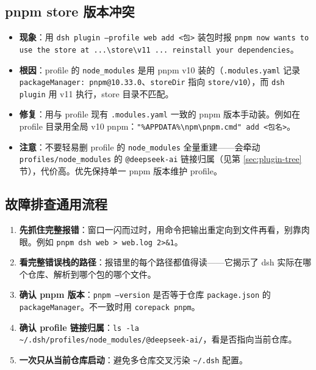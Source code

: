 \documentclass[11pt]{ctexart}
\newcommand{\code}[1]{\texttt{\small #1}}
\begin{document}
\subsection{pnpm store 版本冲突}

\begin{itemize}[itemsep=2pt]
  \item \textbf{现象}：用 \code{dsh plugin --profile web add <包>} 装包时报 \code{pnpm now wants to use the store at ...\textbackslash store\textbackslash v11 ... reinstall your dependencies}。
  \item \textbf{根因}：profile 的 \code{node\_modules} 是用 pnpm v10 装的（\code{.modules.yaml} 记录 \code{packageManager: pnpm@10.33.0}、\code{storeDir} 指向 \code{store/v10}），而 \code{dsh plugin} 用 v11 执行，store 目录不匹配。
  \item \textbf{修复}：用与 profile 现有 \code{.modules.yaml} 一致的 pnpm 版本手动装。例如在 profile 目录用全局 v10 pnpm：\code{"\%APPDATA\%\textbackslash npm\textbackslash pnpm.cmd" add <包名>}。
  \item \textbf{注意}：不要轻易删 profile 的 \code{node\_modules} 全量重建——会牵动 \code{profiles/node\_modules} 的 \code{@deepseek-ai} 链接归属（见第 \ref{sec:plugin-tree} 节），代价高。优先保持单一 pnpm 版本维护 profile。
\end{itemize}

\subsection{故障排查通用流程}

\begin{enumerate}[itemsep=1pt]
  \item \textbf{先抓住完整报错}：窗口一闪而过时，用命令把输出重定向到文件再看，别靠肉眼。例如 \code{pnpm dsh web > web.log 2>\&1}。
  \item \textbf{看完整错误栈的路径}：报错里的每个路径都值得读——它揭示了 dsh 实际在哪个仓库、解析到哪个包的哪个文件。
  \item \textbf{确认 pnpm 版本}：\code{pnpm --version} 是否等于仓库 \code{package.json} 的 \code{packageManager}。不一致时用 \code{corepack pnpm}。
  \item \textbf{确认 profile 链接归属}：\code{ls -la \textasciitilde/.dsh/profiles/node\_modules/@deepseek-ai/}，看是否指向当前仓库。
  \item \textbf{一次只从当前仓库启动}：避免多仓库交叉污染 \code{\textasciitilde/.dsh} 配置。
\end{enumerate}
\end{document}

